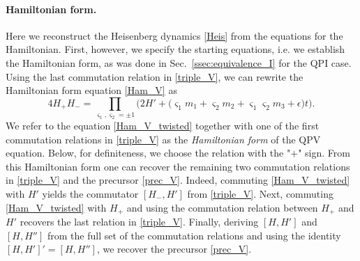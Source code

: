 \documentclass[12pt,a4paper]{article}
\numberwithin{equation}{section}
\begin{document}
\paragraph{Hamiltonian form.}
Here we reconstruct the Heisenberg dynamics \eqref{Heis} from the equations for the Hamiltonian. First, however, we specify the starting equations, i.e. we establish the Hamiltonian form, as was done in Sec.~\ref{ssec:equivalence_I} for the QPI case. Using the last commutation relation in \eqref{triple_V}, we can rewrite the Hamiltonian form equation \eqref{Ham_V} as
\begin{equation}
\label{Ham_V_twisted}
4H_+H_-=\prod_{\varsigma_1,\varsigma_2=\pm1}\Big(2H'+\big(\varsigma_1m_1{+}\varsigma_2m_2{+}\varsigma_1\varsigma_2m_3+\epsilon\big)t\Big). 
\end{equation}
We refer to the equation \eqref{Ham_V_twisted} together with one of the first commutation relations in \eqref{triple_V} as the \textit{Hamiltonian form} of the QPV equation. Below, for definiteness, we choose the relation with the "$+$" sign. From this Hamiltonian form one can recover the remaining two commutation relations in \eqref{triple_V} and the precursor \eqref{prec_V}. Indeed, commuting \eqref{Ham_V_twisted} with $H'$ yields the commutator $[H_-,H']$ from \eqref{triple_V}. Next, commuting \eqref{Ham_V_twisted} with $H_+$ and using the commutation relation between $H_+$ and $H'$ recovers the last relation in \eqref{triple_V}. Finally, deriving $[H,H']$ and $[H,H'']$ from the full set of the commutation relations and using the identity $[H,H']'=[H,H'']$, we recover the precursor \eqref{prec_V}.
\end{document}
